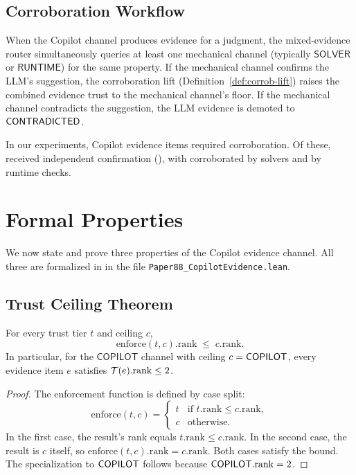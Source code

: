 \documentclass[11pt]{article}
\newcommand{\enforce}{\mathrm{enforce}}
\begin{document}
\subsection{Corroboration Workflow}
\label{sec:gateway:corrob}

When the Copilot channel produces evidence for a judgment, the
mixed-evidence router simultaneously queries at least one
mechanical channel (typically $\mathsf{SOLVER}$ or
$\mathsf{RUNTIME}$) for the same property.  If the mechanical
channel confirms the LLM's suggestion, the corroboration lift
(Definition~\ref{def:corrob-lift}) raises the combined evidence
trust to the mechanical channel's floor.  If the mechanical
channel contradicts the suggestion, the LLM evidence is
demoted to $\mathsf{CONTRADICTED}$.

In our experiments, \ppLXXXVIIIcorrobRequired{} Copilot evidence
items required corroboration.  Of these,
\ppLXXXVIIIcorrobObtained{} received independent confirmation
(\ppLXXXVIIIcorrobRate{}), with \ppLXXXVIIIcorrobBySolver{}
corroborated by solvers and \ppLXXXVIIIcorrobByRuntime{} by
runtime checks.

\section{Formal Properties}
\label{sec:formal}

We now state and prove three properties of the Copilot evidence
channel.  All three are formalized in \LEAN{} in the file
\texttt{Paper88\_CopilotEvidence.lean}.

\subsection{Trust Ceiling Theorem}
\label{sec:formal:ceiling}

\begin{theorem}
\label{thm:ceiling}
For every trust tier $t$ and ceiling $c$,
\[
  \enforce(t, c).\mathrm{rank} \;\leq\; c.\mathrm{rank}.
\]
In particular, for the $\mathsf{COPILOT}$ channel with ceiling
$c = \mathsf{COPILOT}$, every evidence item $e$ satisfies
$\mathcal{T}(e).\mathrm{rank} \leq 2$.
\end{theorem}

\begin{proof}
The enforcement function is defined by case split:
\[
  \enforce(t, c) =
  \begin{cases}
    t & \text{if } t.\mathrm{rank} \leq c.\mathrm{rank}, \\
    c & \text{otherwise.}
  \end{cases}
\]
In the first case, the result's rank equals $t.\mathrm{rank}
\leq c.\mathrm{rank}$.  In the second case, the result is $c$
itself, so $\enforce(t,c).\mathrm{rank} = c.\mathrm{rank}$.
Both cases satisfy the bound.  The specialization to
$\mathsf{COPILOT}$ follows because $\mathsf{COPILOT}.\mathrm{rank} = 2$.
\end{proof}
\end{document}
